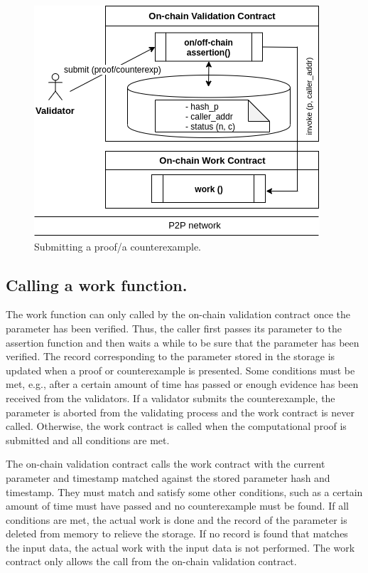 \documentclass[runningheads]{llncs}
\begin{document}
\begin{figure}
\centering
\includegraphics[scale=.8]{validator}
\caption{Submitting a proof/a counterexample.}
\end{figure}

\subsection{Calling a work function.}
The work function can only called by the on-chain validation contract once the parameter has been verified. Thus, the caller first passes its parameter to the assertion function and then waits a while to be sure that the parameter has been verified. The record corresponding to the parameter stored in the storage is updated when a proof or counterexample is presented. Some conditions must be met, e.g., after a certain amount of time has passed or enough evidence has been received from the validators.
If a validator submits the counterexample, the parameter is aborted from the validating process and the work contract is never called. Otherwise, the work contract is called when the computational proof is submitted and all conditions are met. 

 The on-chain validation contract calls the work contract with the current parameter and timestamp matched against the stored parameter hash and timestamp. They must match and satisfy some other conditions, such as a certain amount of time must have passed and no counterexample must be found. If all conditions are met, the actual work is done and the record of the parameter is deleted from memory to relieve the storage. If no record is found that matches the input data, the actual work with the input data is not performed. The work contract only allows the call from the on-chain validation contract.
\end{document}
